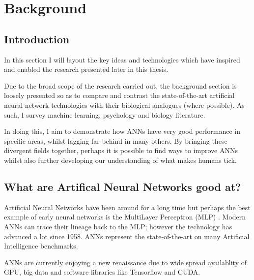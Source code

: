 
\chapter{Background} %

\label{Chapter3} %



\section{Introduction}\label{Lit:Intro}
In this section I will layout the key ideas and technologies which have inspired and enabled the research presented later in this thesis.

Due to the broad scope of the research carried out, the background section is loosely presented so as to compare and contrast the state-of-the-art artificial neural network technologies with their biological analogues (where possible). As such, I survey machine learning, psychology and biology literature.

In doing this, I aim to demonstrate how ANNs have very good performance in specific areas, whilst lagging far behind in many others. By bringing these divergent fields together, perhaps it is possible to find ways to improve ANNs whilst also further developing our understanding of what makes humans tick. 


\section{What are Artifical Neural Networks good at?}
Artificial Neural Networks have been around for a long time but perhaps the best example of early neural networks is the MultiLayer Perceptron (MLP) \cite{rosenblatt1958perceptron}. Modern ANNs can trace their lineage back to the MLP; however the technology has advanced a lot since 1958. ANNs represent the state-of-the-art on many Artificial Intelligence benchmarks.

ANNs are currently enjoying a new renaissance due to wide spread availablity of \ac{GPU}, big data and software libraries like Tensorflow and CUDA.

